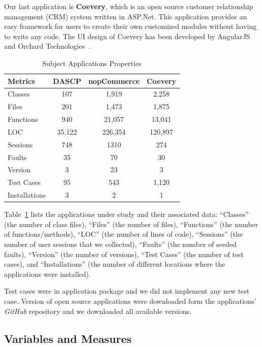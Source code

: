 Our last application is \textbf{Coevery}, which is an open source 
customer relationship management (CRM) system written in ASP.Net. 
This application provides an easy framework for users to create their own customized 
modules without having to write any code. The UI design of Coevery has been developed 
by AngularJS and Orchard Technologies~\cite{coevery}. 

\begin{table}
\caption{Subject Applications Properties}
\begin{center}
\begin{tabular}{|l|c|c|c|} \hline
\textbf{Metrics}  & \textbf{DASCP} & \textbf{nopCommerce} 
& \textbf{Coevery} \\\hline \hline
Classes   & 107  & 1,919& 2,258 \\\hline
Files  & 201  & 1,473 & 1,875 \\\hline
Functions & 940  & 21,057 & 13,041 \\\hline
LOC & 35,122 & 226,354 &120,897 \\\hline
Sessions  & 748 & 1310 & 274 \\\hline
Faults  & 35 & 70 & 30\\\hline
Version  & 3 & 23 & 3 \\\hline
Test Cases & 95& 543 & 1,120 \\\hline
Installations & 3 & 2 & 1 \\\hline
\end{tabular}
\end {center}
\label{tab:AUTs}
\end{table}

Table~\ref{tab:AUTs} lists the applications under study and
their associated data: ``Classes'' (the number of class files), 
``Files'' (the number of files), ``Functions'' (the number of 
functions/methods), ``LOC'' (the number of lines of code), 
``Sessions'' (the number of user sessions that we collected), 
``Faults'' (the number of seeded faults), ``Version'' (the number 
of versions), ``Test Cases'' (the number of test cases), and
``Installations'' (the number of different locations where the 
applications were installed). 

Test cases were in application package and we did not implement any 
new test case. Version of open source applications were downloaded 
form the applications' \textit{GitHub} repository and we downloaded all available versions. 


\vspace*{4pt}
\subsection{Variables and Measures}
\label{sec:measures}


